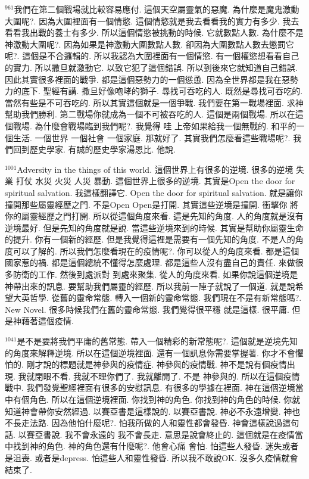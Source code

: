 \documentclass{book}
\begin{document}
$^{961}$我們在第二個戰場就比較容易應付.
這個天空屬靈氣的惡魔.
為什麼是魔鬼激動大圍呢?.
因為大圍裡面有一個情慾.
這個情慾就是我去看看我的實力有多少.
我去看看我出戰的養士有多少.
所以這個情慾被挑動的時候.
它就數點人數.
為什麼不是神激動大圍呢?.
因為如果是神激動大圍數點人數.
卻因為大圍數點人數去懲罰它呢?.
這個是不合邏輯的.
所以我認為大圍裡面有一個情慾.
有一個權慾想看看自己的實力.
所以撒旦就激動它.
以致它犯了這個錯誤.
所以到後來它就知道自己錯誤.
因此其實很多裡面的戰爭.
都是這個惡勢力的一個慫恿.
因為全世界都是我在惡勢力的底下.
聖經有講.
撒旦好像咆哮的獅子.
尋找可吞吃的人.
既然是尋找可吞吃的.
當然有些是不可吞吃的.
所以其實這個就是一個爭戰.
我們要在第一戰場裡面.
求神幫助我們勝利.
第二戰場你就成為一個不可被吞吃的人.
這個是兩個戰場.
所以在這個戰場.
為什麼會戰場臨到我們呢?.
我覺得 哇 上帝如果給我一個無戰的.
和平的一個生活.
一個世界 一個社會 一個家庭.
那就好了.
其實我們怎麼看這些戰場呢?.
我們回到歷史學家.
有誠的歷史學家湯恩比.
他說.

$^{1001}$Adversity in the things of this world.
這個世界上有很多的逆境.
很多的逆境 失業 打仗 水災 火災 人災 暴動.
這個世界上很多的逆境.
其實是Open the door for spiritual salvation.
我這樣翻譯它.
Open the door for spiritual salvation.
就是讓你撞開那些屬靈經歷之門.
不是Open Open是打開.
其實這些逆境是撞開.
衝擊你 將你的屬靈經歷之門打開.
所以從這個角度來看.
這是先知的角度.
人的角度就是沒有逆境最好.
但是先知的角度就是說.
當這些逆境來到的時候.
其實是幫助你屬靈生命的提升.
你有一個新的經歷.
但是我覺得這裡是需要有一個先知的角度.
不是人的角度可以了解的.
所以我們怎麼看現在的疫情呢?.
你可以從人的角度來看.
都是這個國家惹的禍.
都是這個總統不懂得怎麼處理.
都是這些人沒有盡自己的責任.
來做很多防衛的工作.
然後到處派對 到處來聚集.
從人的角度來看.
如果你說這個逆境是神帶出來的訊息.
要幫助我們屬靈的經歷.
所以我前一陣子就說了一個道.
就是說希望大英哲學.
從舊的靈命常態.
轉入一個新的靈命常態.
我們現在不是有新常態嗎?.
New Novel.
很多時候我們在舊的靈命常態.
我們覺得很平穩 就是這樣.
很平庸.
但是神藉著這個疫情.

$^{1041}$是不是要將我們平庸的舊常態.
帶入一個精彩的新常態呢?.
這個就是逆境先知的角度來解釋逆境.
所以在這個逆境裡面.
還有一個訊息你需要掌握著.
你才不會懼怕的.
剛才說的標題就是神參與的疫情症.
神參與的疫情戰.
神不是說有個疫情出現.
我就閉眼不看.
我就不理你們了.
我就離開了.
不是 神參與的.
所以在這個疫情戰中.
我們發覺聖經裡面有很多的安慰訊息.
有很多的學據在裡面.
神在這個逆境當中有個角色.
所以在這個逆境裡面.
你找到神的角色.
你找到神的角色的時候.
你就知道神會帶你安然經過.
以賽亞書是這樣說的.
以賽亞書說.
神必不永遠增變.
神也不長走法路.
因為他怕什麼呢?.
怕我所做的人和靈性都會發昏.
神會這樣說過這句話.
以賽亞書說.
我不會永遠的 我不會長走.
意思是說會終止的.
這個就是在疫情當中找到神的角色.
神的角色還有什麼呢?.
他會心痛 會怕.
怕這些人發昏.
迷失或者是沮喪.
或者是depress.
怕這些人和靈性發昏.
所以我不敢說OK.
沒多久疫情就會結束了.
\end{document}
